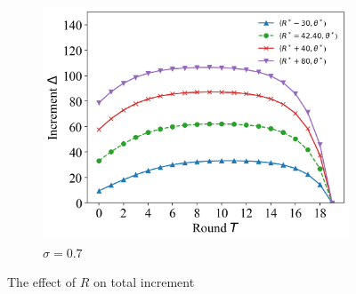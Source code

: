 \documentclass{article}
\theoremstyle{plain}
\theoremstyle{definition}
\theoremstyle{remark}
\begin{document}
\begin{figure}
\begin{subfigure}{0.31\textwidth}
		\includegraphics[width=\textwidth]{figures/figure_71_C.png}
    \caption{$\sigma=0.7$}
	\end{subfigure}
	\caption{The effect of $R$ on total increment}
\end{figure}
\end{document}
